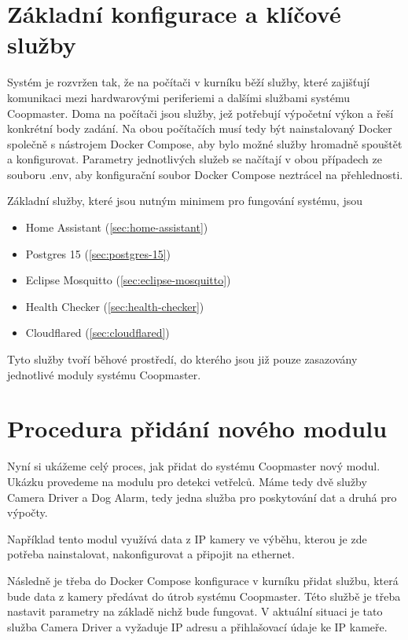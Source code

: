 \section*{Základní konfigurace a klíčové služby}


Systém je rozvržen tak, že na počítači v kurníku běží služby, které zajišťují komunikaci mezi hardwarovými periferiemi a dalšími službami systému Coopmaster.
Doma na počítači jsou služby, jež potřebují výpočetní výkon a řeší konkrétní body zadání.
Na obou počítačích musí tedy být nainstalovaný Docker společně s nástrojem Docker Compose, aby bylo možné služby hromadně spouštět a konfigurovat.
Parametry jednotlivých služeb se načítají v obou případech ze souboru .env, aby konfigurační soubor Docker Compose neztrácel na přehlednosti.\newline

Základní služby, které jsou nutným minimem pro fungování systému, jsou
\begin{itemize}
    \item Home Assistant (\ref{sec:home-assistant})
    \item Postgres 15 (\ref{sec:postgres-15})
    \item Eclipse Mosquitto (\ref{sec:eclipse-mosquitto})
    \item Health Checker (\ref{sec:health-checker})
    \item Cloudflared (\ref{sec:cloudflared})
\end{itemize}
Tyto služby tvoří běhové prostředí, do kterého jsou již pouze zasazovány jednotlivé moduly systému Coopmaster.

\section*{Procedura přidání nového modulu}


Nyní si ukážeme celý proces, jak přidat do systému Coopmaster nový modul.
Ukázku provedeme na modulu pro detekci vetřelců.
Máme tedy dvě služby Camera Driver a Dog Alarm, tedy jedna služba pro poskytování dat a druhá pro výpočty.\newline

Například tento modul využívá data z IP kamery ve výběhu, kterou je zde potřeba nainstalovat, nakonfigurovat a připojit na ethernet.\newline

Následně je třeba do Docker Compose konfigurace v kurníku přidat službu, která bude data z kamery předávat do útrob systému Coopmaster.
Této službě je třeba nastavit parametry na základě nichž bude fungovat.
V aktuální situaci je tato služba Camera Driver a vyžaduje IP adresu a přihlašovací údaje ke IP kameře.\newline


